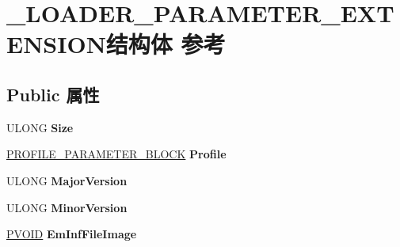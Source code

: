 \hypertarget{struct___l_o_a_d_e_r___p_a_r_a_m_e_t_e_r___e_x_t_e_n_s_i_o_n}{}\section{\+\_\+\+L\+O\+A\+D\+E\+R\+\_\+\+P\+A\+R\+A\+M\+E\+T\+E\+R\+\_\+\+E\+X\+T\+E\+N\+S\+I\+O\+N结构体 参考}
\label{struct___l_o_a_d_e_r___p_a_r_a_m_e_t_e_r___e_x_t_e_n_s_i_o_n}
\subsection*{Public 属性}
\begin{DoxyCompactItemize}
\item 
\mbox{\label{struct___l_o_a_d_e_r___p_a_r_a_m_e_t_e_r___e_x_t_e_n_s_i_o_n_abc5b939e402565b0f84b422728c03e3e}} 
U\+L\+O\+NG {\bfseries Size}
\item 
\mbox{\label{struct___l_o_a_d_e_r___p_a_r_a_m_e_t_e_r___e_x_t_e_n_s_i_o_n_aa32a3b3603617cf9d954ecec83898180}} 
\hyperlink{struct___p_r_o_f_i_l_e___p_a_r_a_m_e_t_e_r___b_l_o_c_k}{P\+R\+O\+F\+I\+L\+E\+\_\+\+P\+A\+R\+A\+M\+E\+T\+E\+R\+\_\+\+B\+L\+O\+CK} {\bfseries Profile}
\item 
\mbox{\label{struct___l_o_a_d_e_r___p_a_r_a_m_e_t_e_r___e_x_t_e_n_s_i_o_n_aa23f832f4266ec017110cdb8c5e60b4e}} 
U\+L\+O\+NG {\bfseries Major\+Version}
\item 
\mbox{\label{struct___l_o_a_d_e_r___p_a_r_a_m_e_t_e_r___e_x_t_e_n_s_i_o_n_a534718e523c607b8fbb644d80d0e4255}} 
U\+L\+O\+NG {\bfseries Minor\+Version}
\item 
\mbox{\label{struct___l_o_a_d_e_r___p_a_r_a_m_e_t_e_r___e_x_t_e_n_s_i_o_n_a118e77a3f9f06423fa27ea621eb68295}} 
\hyperlink{interfacevoid}{P\+V\+O\+ID} {\bfseries Em\+Inf\+File\+Image}
\item 
\mbox{\label{struct___l_o_a_d_e_r___p_a_r_a_m_e_t_e_r___e_x_t_e_n_s_i_o_n_a23b5b1147dcd6a473979a35856ebf3c2}} 

\end{DoxyCompactItemize}
